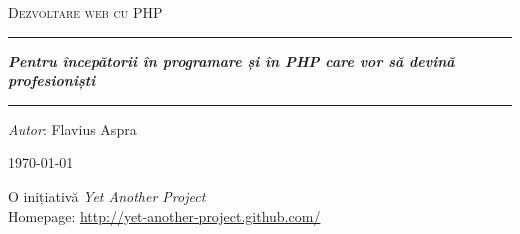 \begin{titlepage}
\thispagestyle{empty}

\vspace*{10em}

\begin{center}
\textsc{\huge Dezvoltare web cu PHP}\\[5em]

\hrule

\vspace{3em}
\textit{\textbf{Pentru începătorii în programare și în PHP care vor să devină profesioniști}}
\vspace{3em}
\hrule
\vspace{8em}
\textit{Autor}: Flavius Aspra
\vspace{3em}

\today
\end{center}

\vfill

\begin{flushright}
\begin{Large}
O inițiativă \emph{Yet Another Project}\\
Homepage: \url{http://yet-another-project.github.com/}
\end{Large}
\end{flushright}

\pagebreak
\end{titlepage}
